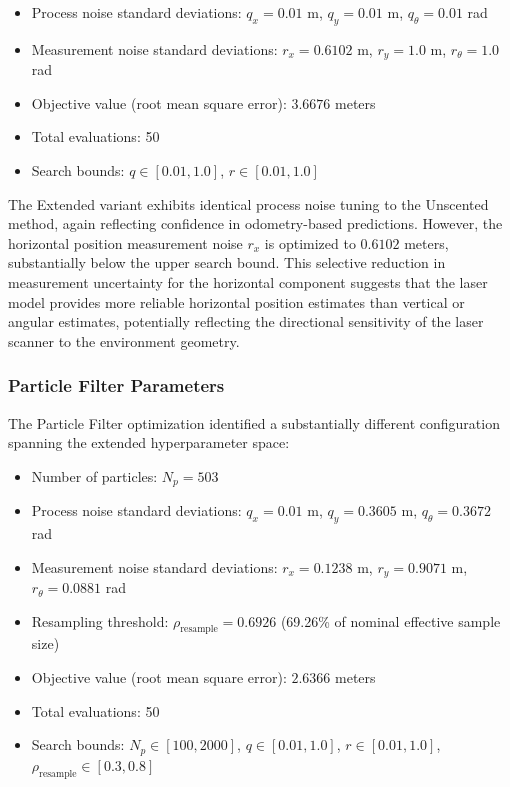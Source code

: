 \documentclass[conference]{IEEEtran}
\begin{document}
\begin{itemize}
    \item Process noise standard deviations: $q_x = 0.01$ m, $q_y = 0.01$ m, $q_\theta = 0.01$ rad
    \item Measurement noise standard deviations: $r_x = 0.6102$ m, $r_y = 1.0$ m, $r_\theta = 1.0$ rad
    \item Objective value (root mean square error): $3.6676$ meters
    \item Total evaluations: 50
    \item Search bounds: $q \in [0.01, 1.0]$, $r \in [0.01, 1.0]$
\end{itemize}

The Extended variant exhibits identical process noise tuning to the Unscented method, again reflecting confidence in odometry-based predictions. However, the horizontal position measurement noise $r_x$ is optimized to $0.6102$ meters, substantially below the upper search bound. This selective reduction in measurement uncertainty for the horizontal component suggests that the laser model provides more reliable horizontal position estimates than vertical or angular estimates, potentially reflecting the directional sensitivity of the laser scanner to the environment geometry.

\subsubsection{Particle Filter Parameters}

The Particle Filter optimization identified a substantially different configuration spanning the extended hyperparameter space:

\begin{itemize}
    \item Number of particles: $N_p = 503$
    \item Process noise standard deviations: $q_x = 0.01$ m, $q_y = 0.3605$ m, $q_\theta = 0.3672$ rad
    \item Measurement noise standard deviations: $r_x = 0.1238$ m, $r_y = 0.9071$ m, $r_\theta = 0.0881$ rad
    \item Resampling threshold: $\rho_{\text{resample}} = 0.6926$ (69.26\% of nominal effective sample size)
    \item Objective value (root mean square error): $2.6366$ meters
    \item Total evaluations: 50
    \item Search bounds: $N_p \in [100, 2000]$, $q \in [0.01, 1.0]$, $r \in [0.01, 1.0]$, $\rho_{\text{resample}} \in [0.3, 0.8]$
\end{itemize}
\end{document}
